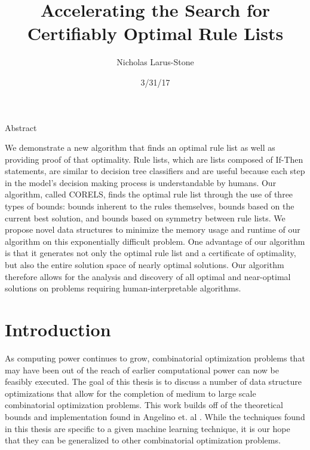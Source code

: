 \documentclass[]{report}
\theoremstyle{definition}
\begin{document}
\title{Accelerating the Search for Certifiably Optimal Rule Lists}
\author{Nicholas Larus-Stone}
\date{3/31/17}
\maketitle

\begin{center}
Abstract
\end{center}

We demonstrate a new algorithm that finds an optimal rule list as well as providing proof of that optimality. Rule lists, which are lists composed of If-Then statements, are similar to decision tree classifiers and are useful because each step in the model's decision making process is understandable by humans. Our algorithm, called CORELS, finds the optimal rule list through the use of three types of bounds: bounds inherent to the rules themselves, bounds based on the current best solution, and bounds based on symmetry between rule lists. We propose novel data structures to minimize the memory usage and runtime of our algorithm on this exponentially difficult problem. One advantage of our algorithm is that it generates not only the optimal rule list and a certificate of optimality, but also the entire solution space of nearly optimal solutions. Our algorithm therefore allows for the analysis and discovery of all optimal and near-optimal solutions on problems requiring human-interpretable algorithms.

\chapter{Introduction}
\label{introduction}

As computing power continues to grow, combinatorial optimization problems that may have been out of the reach of earlier computational power can now be feasibly executed.
The goal of this thesis is to discuss a number of data structure optimizations that allow for the completion of medium to large scale combinatorial optimization problems.
This work builds off of the theoretical bounds and implementation found in Angelino et. al \cite{AngelinoLaAlSeRu17}.
While the techniques found in this thesis are specific to a given machine learning technique, it is our hope that they can be generalized to other combinatorial optimization problems.
\end{document}
